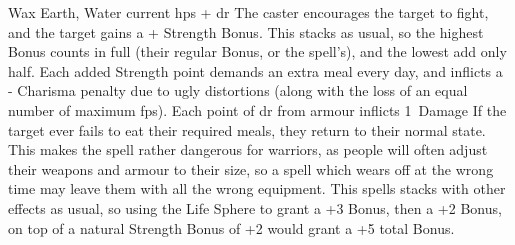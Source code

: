   {}%
  {Wax}%
  {Earth, Water}%
  {current \glspl{hp} + \gls{dr}}%
  {The caster encourages the target to fight, and the target gains a + Strength Bonus.
  This stacks as usual, so the highest Bonus counts in full (their regular Bonus, or the spell's), and the lowest add only half.
  Each added Strength point demands an extra meal every day, and inflicts a - Charisma penalty due to ugly distortions (along with the loss of an equal number of maximum \glspl{fp}).
  Each point of \gls{dr} from armour inflicts 1~Damage}%
  {
    If the target ever fails to eat their required meals, they return to their normal state.
    This makes the spell rather dangerous for warriors, as people will often adjust their weapons and armour to their size, so a spell which wears off at the wrong time may leave them with all the wrong equipment.
    This spells stacks with other effects as usual, so using the Life Sphere to grant a +3 Bonus, then a +2 Bonus, on top of a natural Strength Bonus of +2 would grant a +5 total Bonus.}
